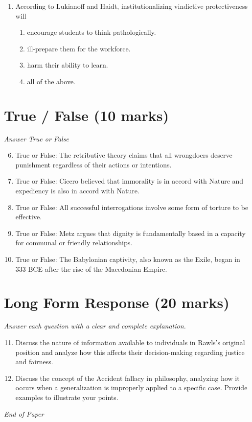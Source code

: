 \documentclass[12pt]{article}
\begin{document}
\begin{enumerate}[label=\arabic*.]
\begin{enumerate}[label=(\alph*)]
    \item egoistic hedonism
    \item moral relativism
\end{enumerate}
\item According to Lukianoff and Haidt, institutionalizing vindictive protectiveness will
\begin{enumerate}[label=(\alph*)]
    \item encourage students to think pathologically.
    \item ill-prepare them for the workforce.
    \item harm their ability to learn.
    \item all of the above.
\end{enumerate}
\end{enumerate}

\section*{True / False (10 marks)}
\textit{Answer True or False}
\begin{enumerate}[label=\arabic*.]
\setcounter{enumi}{5}
\item True or False: The retributive theory claims that all wrongdoers deserve punishment regardless of their actions or intentions.
\item True or False: Cicero believed that immorality is in accord with Nature and expediency is also in accord with Nature.
\item True or False: All successful interrogations involve some form of torture to be effective.
\item True or False: Metz argues that dignity is fundamentally based in a capacity for communal or friendly relationships.
\item True or False: The Babylonian captivity, also known as the Exile, began in 333 BCE after the rise of the Macedonian Empire.
\end{enumerate}

\section*{Long Form Response (20 marks)}
\textit{Answer each question with a clear and complete explanation.}
\begin{enumerate}[label=\arabic*.]
\setcounter{enumi}{10}
\item Discuss the nature of information available to individuals in Rawls's original position and analyze how this affects their decision-making regarding justice and fairness.
\item Discuss the concept of the Accident fallacy in philosophy, analyzing how it occurs when a generalization is improperly applied to a specific case. Provide examples to illustrate your points.
\end{enumerate}

\vfill
\noindent\textit{End of Paper}
\end{document}

